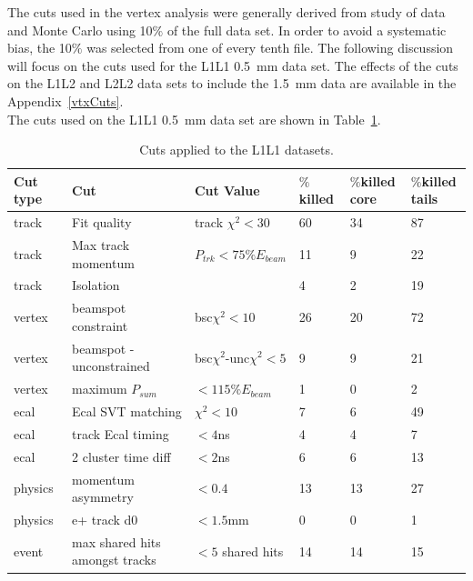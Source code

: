 The cuts used in the vertex analysis were generally derived from study of data and Monte Carlo using 10$\%$ of the full data set. In order to avoid a systematic bias, the 10$\%$ was selected from one of every tenth file. The following discussion will focus on the cuts used for the L1L1 0.5~mm data set. The effects of the cuts on the L1L2 and L2L2 data sets to include the 1.5~mm data are available in the Appendix~\ref{vtxCuts}.\\ 
\indent The cuts used on the L1L1 0.5~mm data set are shown in Table~\ref{tab:l1l1_cuts}.

\begin{table}[H]
\caption{Cuts applied to the L1L1 datasets.}
\label{tab:l1l1_cuts}
\centering
\begin{tabular}{llllll}
\toprule
Cut type & Cut & Cut Value &  $\%$killed &  $\%$killed core & $\%$killed tails\\
\midrule
track & Fit quality & track $\chi^{2}<30$ & 60 & 34 & 87 \\
track & Max track momentum &  $P_{trk}<75\%E_{beam}$ & 11 & 9 & 22 \\
track & Isolation &   & 4 & 2 & 19 \\
vertex & beamspot constraint & bsc$\chi^{2}<10$  & 26 & 20 & 72 \\
vertex & beamspot - unconstrained & bsc$\chi^{2}$-unc$\chi^2<5$  & 9 & 9 & 21 \\
vertex & maximum $P_{sum}$ &  $<115\%E_{beam}$ & 1 & 0 & 2 \\
ecal & Ecal SVT matching & $\chi^2<10$  & 7 & 6 & 49 \\
ecal & track Ecal timing & $<4$ns  & 4 & 4 & 7 \\
ecal & 2 cluster time diff & $<2$ns  & 6 & 6 & 13 \\
physics & momentum asymmetry & $<0.4$  & 13 & 13 & 27 \\
physics & e+ track d0 & $<1.5$mm  & 0 & 0 & 1 \\
event & max shared hits amongst tracks & $<5$ shared hits  & 14 & 14 & 15 \\
\bottomrule
\end{tabular}
\end{table}


